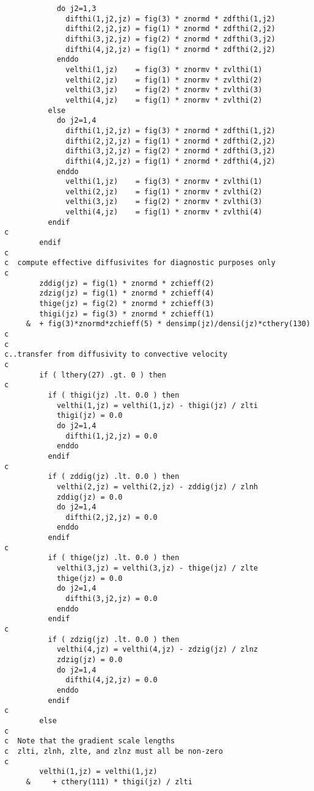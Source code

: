 \begin{verbatim}
            do j2=1,3
              difthi(1,j2,jz) = fig(3) * znormd * zdfthi(1,j2)
              difthi(2,j2,jz) = fig(1) * znormd * zdfthi(2,j2)
              difthi(3,j2,jz) = fig(2) * znormd * zdfthi(3,j2)
              difthi(4,j2,jz) = fig(1) * znormd * zdfthi(2,j2)
            enddo
              velthi(1,jz)    = fig(3) * znormv * zvlthi(1)
              velthi(2,jz)    = fig(1) * znormv * zvlthi(2)
              velthi(3,jz)    = fig(2) * znormv * zvlthi(3)
              velthi(4,jz)    = fig(1) * znormv * zvlthi(2)
          else
            do j2=1,4
              difthi(1,j2,jz) = fig(3) * znormd * zdfthi(1,j2)
              difthi(2,j2,jz) = fig(1) * znormd * zdfthi(2,j2)
              difthi(3,j2,jz) = fig(2) * znormd * zdfthi(3,j2)
              difthi(4,j2,jz) = fig(1) * znormd * zdfthi(4,j2)
            enddo
              velthi(1,jz)    = fig(3) * znormv * zvlthi(1)
              velthi(2,jz)    = fig(1) * znormv * zvlthi(2)
              velthi(3,jz)    = fig(2) * znormv * zvlthi(3)
              velthi(4,jz)    = fig(1) * znormv * zvlthi(4)
          endif
c
        endif
c
c  compute effective diffusivites for diagnostic purposes only
c
        zddig(jz) = fig(1) * znormd * zchieff(2)
        zdzig(jz) = fig(1) * znormd * zchieff(4)
        thige(jz) = fig(2) * znormd * zchieff(3)
        thigi(jz) = fig(3) * znormd * zchieff(1)
     &  + fig(3)*znormd*zchieff(5) * densimp(jz)/densi(jz)*cthery(130)
c
c
c..transfer from diffusivity to convective velocity
c
        if ( lthery(27) .gt. 0 ) then
c
          if ( thigi(jz) .lt. 0.0 ) then
            velthi(1,jz) = velthi(1,jz) - thigi(jz) / zlti
            thigi(jz) = 0.0
            do j2=1,4
              difthi(1,j2,jz) = 0.0
            enddo
          endif
c
          if ( zddig(jz) .lt. 0.0 ) then
            velthi(2,jz) = velthi(2,jz) - zddig(jz) / zlnh
            zddig(jz) = 0.0
            do j2=1,4
              difthi(2,j2,jz) = 0.0
            enddo
          endif
c
          if ( thige(jz) .lt. 0.0 ) then
            velthi(3,jz) = velthi(3,jz) - thige(jz) / zlte
            thige(jz) = 0.0
            do j2=1,4
              difthi(3,j2,jz) = 0.0
            enddo
          endif
c
          if ( zdzig(jz) .lt. 0.0 ) then
            velthi(4,jz) = velthi(4,jz) - zdzig(jz) / zlnz
            zdzig(jz) = 0.0
            do j2=1,4
              difthi(4,j2,jz) = 0.0
            enddo
          endif
c
        else
c
c  Note that the gradient scale lengths
c  zlti, zlnh, zlte, and zlnz must all be non-zero
c
        velthi(1,jz) = velthi(1,jz)
     &     + cthery(111) * thigi(jz) / zlti

\end{verbatim}
